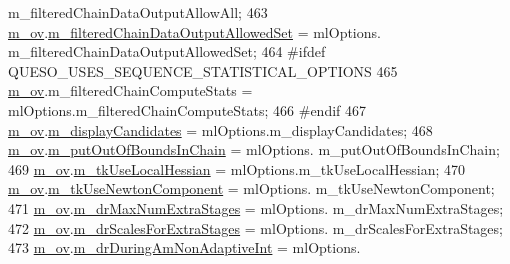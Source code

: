 \begin{DoxyCode}
      m\_filteredChainDataOutputAllowAll;
463   \hyperlink{class_q_u_e_s_o_1_1_metropolis_hastings_s_g_options_a9d4792d9fc2dc5439b8ab489b0c236eb}{m\_ov}.\hyperlink{class_q_u_e_s_o_1_1_mh_options_values_ab465e2184857848c2276578b2b08baab}{m\_filteredChainDataOutputAllowedSet}         = mlOptions.
      m\_filteredChainDataOutputAllowedSet;
464 \textcolor{preprocessor}{#ifdef QUESO\_USES\_SEQUENCE\_STATISTICAL\_OPTIONS}
465 \textcolor{preprocessor}{}  \hyperlink{class_q_u_e_s_o_1_1_metropolis_hastings_s_g_options_a9d4792d9fc2dc5439b8ab489b0c236eb}{m\_ov}.m\_filteredChainComputeStats                 = mlOptions.m\_filteredChainComputeStats;
466 \textcolor{preprocessor}{#endif}
467 \textcolor{preprocessor}{}  \hyperlink{class_q_u_e_s_o_1_1_metropolis_hastings_s_g_options_a9d4792d9fc2dc5439b8ab489b0c236eb}{m\_ov}.\hyperlink{class_q_u_e_s_o_1_1_mh_options_values_a1df386cecfd87745e4d8adfb472d3443}{m\_displayCandidates}                         = mlOptions.m\_displayCandidates;
468   \hyperlink{class_q_u_e_s_o_1_1_metropolis_hastings_s_g_options_a9d4792d9fc2dc5439b8ab489b0c236eb}{m\_ov}.\hyperlink{class_q_u_e_s_o_1_1_mh_options_values_a6500d388ce724964ed858174a454177a}{m\_putOutOfBoundsInChain}                     = mlOptions.
      m\_putOutOfBoundsInChain;
469   \hyperlink{class_q_u_e_s_o_1_1_metropolis_hastings_s_g_options_a9d4792d9fc2dc5439b8ab489b0c236eb}{m\_ov}.\hyperlink{class_q_u_e_s_o_1_1_mh_options_values_a3fa3d465b07ea276e7b2aa68b897e4ec}{m\_tkUseLocalHessian}                         = mlOptions.m\_tkUseLocalHessian;
470   \hyperlink{class_q_u_e_s_o_1_1_metropolis_hastings_s_g_options_a9d4792d9fc2dc5439b8ab489b0c236eb}{m\_ov}.\hyperlink{class_q_u_e_s_o_1_1_mh_options_values_ae4fcf242f3d9e216c17d057faf6939c3}{m\_tkUseNewtonComponent}                      = mlOptions.
      m\_tkUseNewtonComponent;
471   \hyperlink{class_q_u_e_s_o_1_1_metropolis_hastings_s_g_options_a9d4792d9fc2dc5439b8ab489b0c236eb}{m\_ov}.\hyperlink{class_q_u_e_s_o_1_1_mh_options_values_ab72acd4e4b80dd5c3a4b361466474f21}{m\_drMaxNumExtraStages}                       = mlOptions.
      m\_drMaxNumExtraStages;
472   \hyperlink{class_q_u_e_s_o_1_1_metropolis_hastings_s_g_options_a9d4792d9fc2dc5439b8ab489b0c236eb}{m\_ov}.\hyperlink{class_q_u_e_s_o_1_1_mh_options_values_a37774da61eda0aaa92dbcc417944b2e2}{m\_drScalesForExtraStages}                    = mlOptions.
      m\_drScalesForExtraStages;
473   \hyperlink{class_q_u_e_s_o_1_1_metropolis_hastings_s_g_options_a9d4792d9fc2dc5439b8ab489b0c236eb}{m\_ov}.\hyperlink{class_q_u_e_s_o_1_1_mh_options_values_ab546a17967c0690d0c01730f63ccb70b}{m\_drDuringAmNonAdaptiveInt}                  = mlOptions.

\end{DoxyCode}
